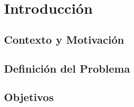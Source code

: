 
\section{Introducci\'on}
\label{sec:introduccion}


\subsection{Contexto y Motivaci\'on}
\label{subsec:contexto-motivacion}


\subsection{Definici\'on del Problema}
\label{subsec:definicion-problema}


\subsection{Objetivos}
\label{subsec:objetivos}


